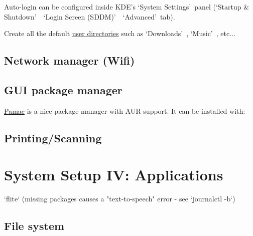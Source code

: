 Auto-login can be configured inside KDE's \lq System Settings\rq\ panel (\lq Startup \& Shutdown\rq\ \rightarrow\ \lq Login Screen (SDDM)\rq\ \rightarrow\ \lq Advanced\rq\ tab).

\begin{blocksection}
	Create all the default \href{https://wiki.archlinux.org/index.php/XDG_user_directories}{user directories} such as \lq Downloads\rq\ , \lq Music\rq\  , etc...
\end{blocksection}

\subsection{Network manager (Wifi)}

\subsection{GUI package manager}

\href{https://wiki.manjaro.org/index.php?title=Pamac}{Pamac} is a nice package manager with AUR support. It can be installed with:


\subsection{Printing/Scanning}


\section{System Setup IV: Applications}

`flite` (missing packages causes a "text-to-speech" error - see `journalctl -b`)


\subsection{File system}


